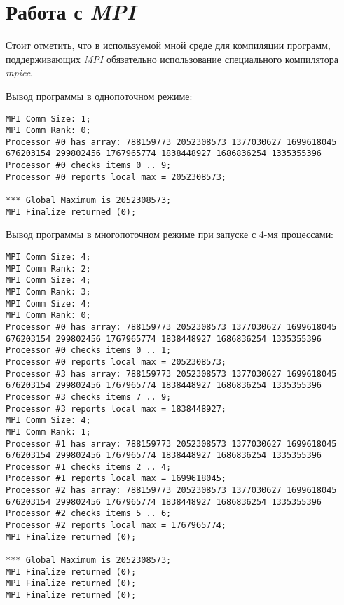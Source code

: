 \section{Работа с \textit{MPI}}

Стоит отметить, что в используемой мной среде для компиляции программ, поддерживающих \textit{MPI} обязательно использование специального компилятора \textit{mpicc}.

Вывод программы в однопоточном режиме:
\begin{tiny}
\begin{verbatim}
MPI Comm Size: 1;
MPI Comm Rank: 0;
Processor #0 has array: 788159773 2052308573 1377030627 1699618045 676203154 299802456 1767965774 1838448927 1686836254 1335355396
Processor #0 checks items 0 .. 9;
Processor #0 reports local max = 2052308573;

*** Global Maximum is 2052308573;
MPI Finalize returned (0);
\end{verbatim}
\end{tiny}

Вывод программы в многопоточном режиме при запуске с 4-мя процессами:
\begin{tiny}
\begin{verbatim}
MPI Comm Size: 4;
MPI Comm Rank: 2;
MPI Comm Size: 4;
MPI Comm Rank: 3;
MPI Comm Size: 4;
MPI Comm Rank: 0;
Processor #0 has array: 788159773 2052308573 1377030627 1699618045 676203154 299802456 1767965774 1838448927 1686836254 1335355396
Processor #0 checks items 0 .. 1;
Processor #0 reports local max = 2052308573;
Processor #3 has array: 788159773 2052308573 1377030627 1699618045 676203154 299802456 1767965774 1838448927 1686836254 1335355396
Processor #3 checks items 7 .. 9;
Processor #3 reports local max = 1838448927;
MPI Comm Size: 4;
MPI Comm Rank: 1;
Processor #1 has array: 788159773 2052308573 1377030627 1699618045 676203154 299802456 1767965774 1838448927 1686836254 1335355396
Processor #1 checks items 2 .. 4;
Processor #1 reports local max = 1699618045;
Processor #2 has array: 788159773 2052308573 1377030627 1699618045 676203154 299802456 1767965774 1838448927 1686836254 1335355396
Processor #2 checks items 5 .. 6;
Processor #2 reports local max = 1767965774;
MPI Finalize returned (0);

*** Global Maximum is 2052308573;
MPI Finalize returned (0);
MPI Finalize returned (0);
MPI Finalize returned (0);
\end{verbatim}
\end{tiny}
